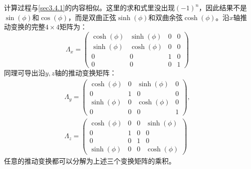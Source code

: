 计算过程与\ref{sec3.4.1}的内容相似。这里的求和式里没出现$(-1)^n$，因此结果不是$\sin(\phi)$和$\cos (\phi)$，而是双曲正弦$\sinh(\phi)$和双曲余弦$\cosh(\phi)$。沿$x$轴推动变换的完整$4 \times 4$矩阵为：
\begin{equation}
\label{equ3.144}
	\Lambda_x =
		\begin{pmatrix}
			\cosh(\phi) & \sinh(\phi) & 0 & 0 \\
			\sinh(\phi) & \cosh(\phi) & 0 & 0 \\
			0 & 0 & 1 & 0 \\
			0 & 0 & 0 & 1
		\end{pmatrix}
\end{equation}
同理可导出沿$y, z$轴的推动变换矩阵：
\begin{align}
\label{equ3.145}
	\Lambda_y =
		\begin{pmatrix}
			\cosh(\phi) & 0 & \sinh(\phi) & 0 \\
			0 & 1 & 0 & 0 \\
			\sinh(\phi) & 0 & \cosh(\phi) & 0 \\
			0 & 0 & 0 & 1
		\end{pmatrix}
	, \\
\label{equ3.146}
	\Lambda_z =
		\begin{pmatrix}
			\cosh(\phi) & 0 & 0 & \sinh(\phi) \\
			0 & 1 & 0 & 0 \\
			0 & 0 & 1 & 0 \\
			\sinh(\phi) & 0 & 0 & \cosh(\phi)
		\end{pmatrix}
\end{align}
任意的推动变换都可以分解为上述三个变换矩阵的乘积。

